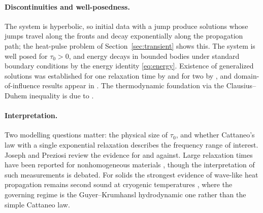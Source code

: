 \paragraph{Discontinuities and well-posedness.} The system is hyperbolic, so initial data with a jump produce solutions whose jumps travel along the fronts and decay exponentially along the propagation path; the heat-pulse problem of Section~\ref{sec:transient} shows this. The system is well posed for $\tau_0>0$, and energy decays in bounded bodies under standard boundary conditions by the energy identity \eqref{eq:energy}. Existence of generalized solutions was established for one relaxation time by \citep{Bem1982} and for two by \citep{Bem1983}, and domain-of-influence results appear in \citep{Ignaczak1980}. The thermodynamic foundation via the Clausius--Duhem inequality is due to \citep{GurtinWilliams1966}.

\paragraph{Interpretation.} Two modelling questions matter: the physical size of $\tau_0$, and whether Cattaneo's law with a single exponential relaxation describes the frequency range of interest. Joseph and Preziosi \citep{Joseph1989,Joseph1990} review the evidence for and against. Large relaxation times have been reported for nonhomogeneous materials \citep{Kaminski1990,Mitra1995}, though the interpretation of such measurements is debated. For solids the strongest evidence of wave-like heat propagation remains second sound at cryogenic temperatures \citep{Ackerman1966,Jackson1970}, where the governing regime is the Guyer--Krumhansl hydrodynamic one \citep{GuyerKrumhansl1966II} rather than the simple Cattaneo law.

